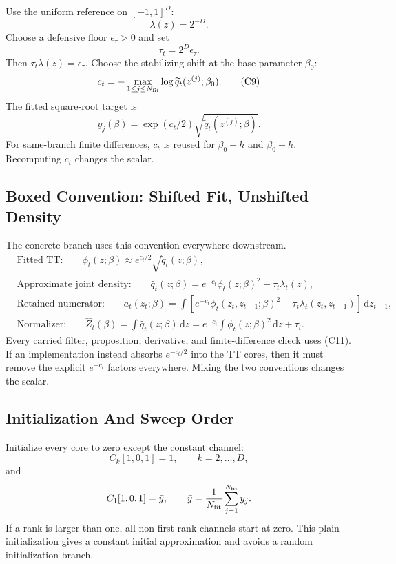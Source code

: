 \documentclass[11pt]{article}
\newcommand{\dd}{\,\mathrm d}
\begin{document}
Use the uniform reference on \([-1,1]^D\):
\[
    \lambda(z)=2^{-D}.
    \tag{C7}
\]
Choose a defensive floor \(\epsilon_\tau>0\) and set
\[
    \tau_t=2^D\epsilon_\tau.
    \tag{C8}
\]
Then \(\tau_t\lambda(z)=\epsilon_\tau\).  Choose the stabilizing shift at the
base parameter \(\beta_0\):
\[
    c_t=-\max_{1\le j\le N_{\rm fit}}
    \log \widetilde q_t(z^{(j)};\beta_0).
    \tag{C9}
\]
The fitted square-root target is
\[
    y_j(\beta)=\exp(c_t/2)\sqrt{\widetilde q_t(z^{(j)};\beta)}.
    \tag{C10}
\]
For same-branch finite differences, \(c_t\) is reused for
\(\beta_0+h\) and \(\beta_0-h\).  Recomputing \(c_t\) changes the scalar.

\subsection{Boxed Convention: Shifted Fit, Unshifted Density}

The concrete branch uses this convention everywhere downstream.
\[
\boxed{
\begin{aligned}
&\text{Fitted TT:}\qquad
  \phi_t(z;\beta)\approx e^{c_t/2}\sqrt{\widetilde q_t(z;\beta)},\\
&\text{Approximate joint density:}\qquad
  \widehat q_t(z;\beta)
  =
  e^{-c_t}\phi_t(z;\beta)^2+\tau_t\lambda_t(z),\\
&\text{Retained numerator:}\qquad
  a_t(z_t;\beta)
  =
  \int
  \left[e^{-c_t}\phi_t(z_t,z_{t-1};\beta)^2
        +\tau_t\lambda_t(z_t,z_{t-1})\right]\dd z_{t-1},\\
&\text{Normalizer:}\qquad
  \widehat Z_t(\beta)
  =
  \int \widehat q_t(z;\beta)\dd z
  =
  e^{-c_t}\int\phi_t(z;\beta)^2\dd z+\tau_t.
\end{aligned}}
\tag{C11}
\]
Every carried filter, proposition, derivative, and finite-difference check uses
(C11).  If an implementation instead absorbs \(e^{-c_t/2}\) into the TT cores,
then it must remove the explicit \(e^{-c_t}\) factors everywhere.  Mixing the
two conventions changes the scalar.

\subsection{Initialization And Sweep Order}

Initialize every core to zero except the constant channel:
\[
    C_k[1,0,1]=1,\qquad k=2,\ldots,D,
\]
and
\[
    C_1[1,0,1]=\bar y,\qquad
    \bar y=\frac1{N_{\rm fit}}\sum_{j=1}^{N_{\rm fit}}y_j.
\]
If a rank is larger than one, all non-first rank channels start at zero.  This
plain initialization gives a constant initial approximation and avoids a random
initialization branch.
\end{document}
